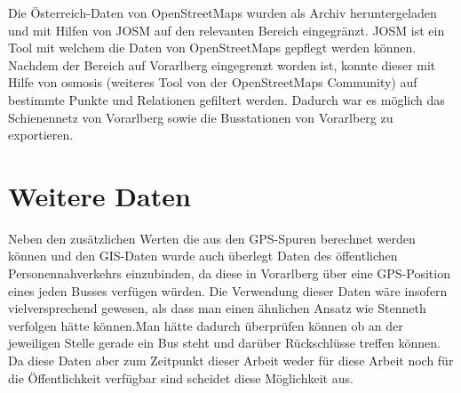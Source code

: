 Die Österreich-Daten von OpenStreetMaps wurden als Archiv heruntergeladen und mit Hilfen von JOSM auf den relevanten Bereich eingegränzt. JOSM ist ein Tool mit welchem die Daten von OpenStreetMaps gepflegt werden können. Nachdem der Bereich auf Vorarlberg eingegrenzt worden ist, konnte dieser mit Hilfe von osmosis (weiteres Tool von der OpenStreetMaps Community) auf bestimmte Punkte und Relationen gefiltert werden. Dadurch war es möglich das Schienennetz von Vorarlberg sowie die Busstationen von Vorarlberg zu exportieren.

\section{Weitere Daten}
Neben den zusätzlichen Werten die aus den GPS-Spuren berechnet werden können und den GIS-Daten wurde auch überlegt Daten des öffentlichen Personennahverkehrs einzubinden, da diese in Vorarlberg über eine GPS-Position eines jeden Busses verfügen würden. Die Verwendung dieser Daten wäre insofern vielversprechend gewesen, als dass man einen ähnlichen Ansatz wie Stenneth verfolgen hätte können.Man hätte dadurch überprüfen können ob an der jeweiligen Stelle gerade ein Bus steht und darüber Rückschlüsse treffen können. Da diese Daten aber zum Zeitpunkt dieser Arbeit weder für diese Arbeit noch für die Öffentlichkeit verfügbar sind scheidet diese Möglichkeit aus.


